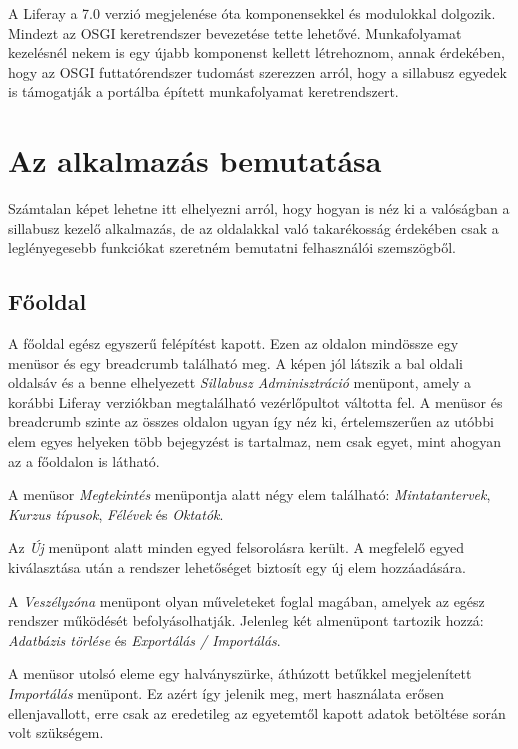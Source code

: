 \documentclass[hidelinks, 12pt, a4paper]{report}
\begin{document}
A Liferay a 7.0 verzió megjelenése óta komponensekkel és modulokkal dolgozik. Mindezt az OSGI keretrendszer bevezetése tette lehetővé. Munkafolyamat kezelésnél nekem is egy újabb komponenst kellett létrehoznom, annak érdekében, hogy az OSGI futtatórendszer tudomást szerezzen arról, hogy a sillabusz egyedek is támogatják a portálba épített munkafolyamat keretrendszert.

\chapter{Az alkalmazás bemutatása}

Számtalan képet lehetne itt elhelyezni arról, hogy hogyan is néz ki a valóságban a sillabusz kezelő alkalmazás, de az oldalakkal való takarékosság érdekében csak a leglényegesebb funkciókat szeretném bemutatni felhasználói szemszögből.

\section{Főoldal}

A főoldal egész egyszerű felépítést kapott. Ezen az oldalon mindössze egy menüsor és egy breadcrumb található meg. A képen jól látszik a bal oldali oldalsáv és a benne elhelyezett \emph{Sillabusz Adminisztráció} menüpont, amely a korábbi Liferay verziókban megtalálható vezérlőpultot váltotta fel. A menüsor és breadcrumb szinte az összes oldalon ugyan így néz ki, értelemszerűen az utóbbi elem egyes helyeken több bejegyzést is tartalmaz, nem csak egyet, mint ahogyan az a főoldalon is látható.

A menüsor \emph{Megtekintés} menüpontja alatt négy elem található: \emph{Mintatantervek}, \emph{Kurzus típusok}, \emph{Félévek} és \emph{Oktatók}.

Az \emph{Új} menüpont alatt minden egyed felsorolásra került. A megfelelő egyed kiválasztása után a rendszer lehetőséget biztosít egy új elem hozzáadására.

A \emph{Veszélyzóna} menüpont olyan műveleteket foglal magában, amelyek az egész rendszer működését befolyásolhatják. Jelenleg két almenüpont tartozik hozzá: \emph{Adatbázis törlése} és \emph{Exportálás / Importálás}.

A menüsor utolsó eleme egy halványszürke, áthúzott betűkkel megjelenített \emph{Importálás} menüpont. Ez azért így jelenik meg, mert használata erősen ellenjavallott, erre csak az eredetileg az egyetemtől kapott adatok betöltése során volt szükségem.
\end{document}
